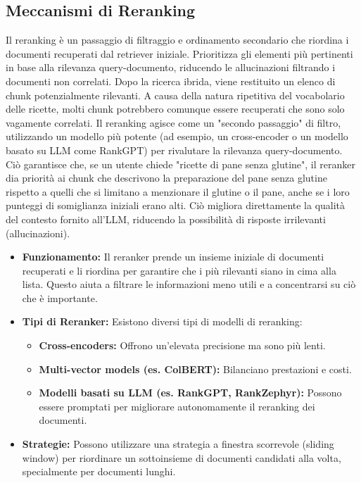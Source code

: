 \documentclass[a4paper, 11pt]{article}
\begin{document}
\subsection{Meccanismi di Reranking}
Il reranking è un passaggio di filtraggio e ordinamento secondario che riordina i documenti recuperati dal retriever iniziale. \cite{mastering_rag_reranking} Prioritizza gli elementi più pertinenti in base alla rilevanza query-documento, riducendo le allucinazioni filtrando i documenti non correlati. \cite{mastering_rag_reranking} Dopo la ricerca ibrida, viene restituito un elenco di chunk potenzialmente rilevanti. A causa della natura ripetitiva del vocabolario delle ricette, molti chunk potrebbero comunque essere recuperati che sono solo vagamente correlati. Il reranking agisce come un "secondo passaggio" di filtro, utilizzando un modello più potente (ad esempio, un cross-encoder o un modello basato su LLM come RankGPT) per rivalutare la rilevanza query-documento. Ciò garantisce che, se un utente chiede "ricette di pane senza glutine", il reranker dia priorità ai chunk che descrivono la preparazione del pane senza glutine rispetto a quelli che si limitano a menzionare il glutine o il pane, anche se i loro punteggi di somiglianza iniziali erano alti. Ciò migliora direttamente la qualità del contesto fornito all'LLM, riducendo la possibilità di risposte irrilevanti (allucinazioni). \cite{mastering_rag_reranking}
\begin{itemize}
    \item \textbf{Funzionamento:} Il reranker prende un insieme iniziale di documenti recuperati e li riordina per garantire che i più rilevanti siano in cima alla lista. \cite{rankgpt_reranking} Questo aiuta a filtrare le informazioni meno utili e a concentrarsi su ciò che è importante.
    \item \textbf{Tipi di Reranker:} Esistono diversi tipi di modelli di reranking:
    \begin{itemize}
        \item \textbf{Cross-encoders:} Offrono un'elevata precisione ma sono più lenti. \cite{mastering_rag_reranking}
        \item \textbf{Multi-vector models (es. ColBERT):} Bilanciano prestazioni e costi. \cite{mastering_rag_reranking}
        \item \textbf{Modelli basati su LLM (es. RankGPT, RankZephyr):} Possono essere promptati per migliorare autonomamente il reranking dei documenti. \cite{mastering_rag_reranking}
    \end{itemize}
    \item \textbf{Strategie:} Possono utilizzare una strategia a finestra scorrevole (sliding window) per riordinare un sottoinsieme di documenti candidati alla volta, specialmente per documenti lunghi. \cite{mastering_rag_reranking}
\end{itemize}
\end{document}

